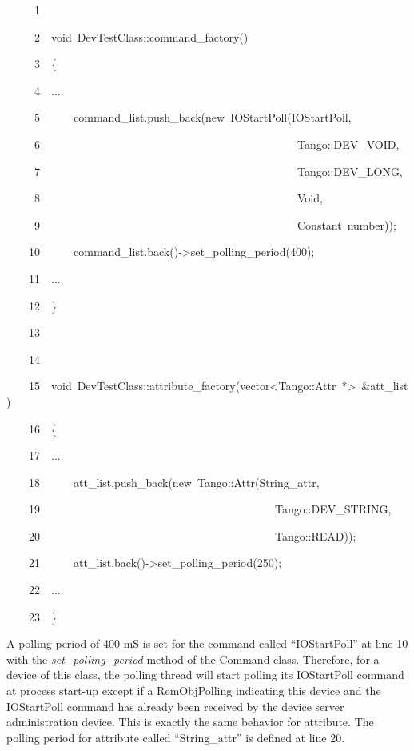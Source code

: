 
\begin{lyxcode}
~~~~~1~~

~~~~~2~~void~DevTestClass::command\_factory()

~~~~~3~~\{

~~~~~4~~...

~~~~~5~~~~~~command\_list.push\_back(new~IOStartPoll(\textquotedbl{}IOStartPoll\textquotedbl{},

~~~~~6~~~~~~~~~~~~~~~~~~~~~~~~~~~~~~~~~~~~~~~~~~~~~~Tango::DEV\_VOID,

~~~~~7~~~~~~~~~~~~~~~~~~~~~~~~~~~~~~~~~~~~~~~~~~~~~~Tango::DEV\_LONG,

~~~~~8~~~~~~~~~~~~~~~~~~~~~~~~~~~~~~~~~~~~~~~~~~~~~~\textquotedbl{}Void\textquotedbl{},

~~~~~9~~~~~~~~~~~~~~~~~~~~~~~~~~~~~~~~~~~~~~~~~~~~~~\textquotedbl{}Constant~number\textquotedbl{}));

~~~~10~~~~~~command\_list.back()->set\_polling\_period(400);

~~~~11~~...

~~~~12~~\}

~~~~13~~

~~~~14~~

~~~~15~~void~DevTestClass::attribute\_factory(vector<Tango::Attr~{*}>~\&att\_list)

~~~~16~~\{

~~~~17~~...

~~~~18~~~~~~att\_list.push\_back(new~Tango::Attr(\textquotedbl{}String\_attr\textquotedbl{},

~~~~19~~~~~~~~~~~~~~~~~~~~~~~~~~~~~~~~~~~~~~~~~~Tango::DEV\_STRING,

~~~~20~~~~~~~~~~~~~~~~~~~~~~~~~~~~~~~~~~~~~~~~~~Tango::READ));

~~~~21~~~~~~att\_list.back()->set\_polling\_period(250);

~~~~22~~...

~~~~23~~\}
\end{lyxcode}


A polling period of 400 mS is set for the command called ``IOStartPoll''
at line 10 with the \emph{set\_polling\_period} method of the Command
class. Therefore, for a device of this class, the polling thread will
start polling its IOStartPoll command at process start-up except if
a RemObjPolling indicating this device and the IOStartPoll command
has already been received by the device server administration device.
This is exactly the same behavior for attribute. The polling period
for attribute called ``String\_attr'' is defined at line 20.


